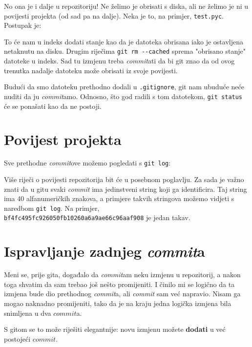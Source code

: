 No ona je i dalje u repozitoriju!
Ne želimo je obrisati s diska, ali ne želimo je ni u povijesti projekta (od sad pa na dalje).
Neka je to, na primjer, \verb+test.pyc+.
Postupak je:


To će nam u indeks dodati stanje kao da je datoteka obrisana iako je ostavljena netaknutu na disku.
Drugim riječima \verb+git rm --cached+ sprema "obrisano stanje" datoteke u indeks.
Sad tu izmjenu treba \emph{commit}ati da bi git znao da od ovog trenutka nadalje datoteku može obrisati iz svoje povijesti.

Budući da smo datoteku prethodno dodali u \verb+.gitignore+, git nam ubuduće neće nuditi da ju \emph{commit}amo.
Odnosno, što god radili s tom datotekom, \verb+git status+ će se ponašati kao da ne postoji.

\section*{Povijest projekta}

Sve prethodne \emph{commit}ove možemo pogledati s \verb+git log+:



Više riječi o povijesti repozitorija bit će u posebnom poglavlju. 
Za sada je važno znati da u gitu svaki \emph{commit} ima jedinstveni string koji ga identificira.
Taj string ima 40 alfanumeričkih znakova, a primjere takvih stringova možemo vidjeti s naredbom \verb+git log+.
Na primjer, \\\verb+bf4fc495fc926050fb10260a6a9ae66c96aaf908+ je jedan takav.

\section*{Ispravljanje zadnjeg \emph{commit}a}

Meni se, prije gita, događalo da \emph{commit}am neku izmjenu u repozitorij, a nakon toga shvatim da sam trebao još nešto promijeniti.
I činilo mi se logično da ta izmjena bude dio prethodnog \emph{commit}a, ali \emph{commit} sam već napravio.
Nisam ga mogao naknadno promijeniti, tako da je na kraju jedna logička izmjena bila snimljena u dva $commit$a.

S gitom se to može riješiti elegantnije: novu izmjenu možete \textbf{dodati} u već postojeći $commit$.

